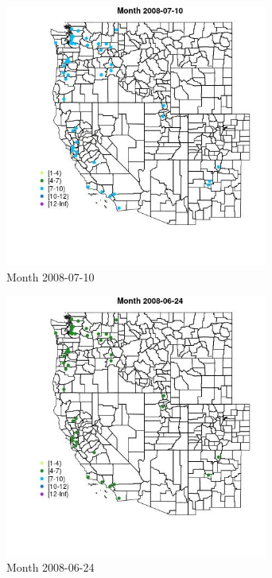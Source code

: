 \begin{figure} 
\centering  
\includegraphics[width=0.77\textwidth]{Code_Outputs/Report_ML_input_PM25_Step4_part_e_de_duplicated_aves_MapObsMonth2008-07-10.jpg} 
\caption{\label{fig:Report_ML_input_PM25_Step4_part_e_de_duplicated_avesMapObsMonth2008-07-10}Month 2008-07-10} 
\end{figure} 
 

\begin{figure} 
\centering  
\includegraphics[width=0.77\textwidth]{Code_Outputs/Report_ML_input_PM25_Step4_part_e_de_duplicated_aves_MapObsMonth2008-06-24.jpg} 
\caption{\label{fig:Report_ML_input_PM25_Step4_part_e_de_duplicated_avesMapObsMonth2008-06-24}Month 2008-06-24} 
\end{figure} 
 

